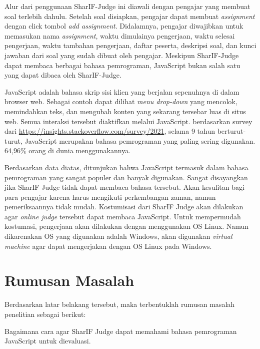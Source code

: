 \documentclass[a4paper,twoside]{article}
\begin{document}
Alur dari penggunaan SharIF-Judge ini diawali dengan pengajar yang membuat soal terlebih dahulu. Setelah soal disiapkan, pengajar dapat membuat \textit{assignment} dengan click tombol \textit{add assignment}. Didalamnya, pengajar diwajibkan untuk memasukan nama \textit{assignment}, waktu dimulainya pengerjaan, waktu selesai pengerjaan, waktu tambahan pengerjaan, daftar peserta, deskripsi soal, dan kunci jawaban dari soal yang sudah dibuat oleh pengajar. Meskipun SharIF-Judge dapat membaca berbagai bahasa pemrograman, JavaScript bukan salah satu yang dapat dibaca oleh SharIF-Judge.

JavaScript adalah bahasa skrip sisi klien yang berjalan sepenuhnya di dalam browser web. Sebagai contoh dapat dilihat \textit{menu drop-down} yang mencolok, memindahkan teks, dan mengubah konten yang sekarang tersebar luas di situs web. Semua interaksi tersebut diaktifkan melalui JavaScript. berdasarkan survey dari \url{https://insights.stackoverflow.com/survey/2021}, selama 9 tahun berturut-turut, JavaScript merupakan bahasa pemrograman yang paling sering digunakan. 64,96\% orang di dunia menggunakannya.

Berdasarkan data diatas, ditunjukan bahwa JavaScript termasuk dalam bahasa pemrograman yang sangat populer dan banyak digunakan. Sangat disayangkan jika SharIF Judge tidak dapat membaca bahasa tersebut. Akan kesulitan bagi para pengajar karena harus mengikuti perkembangan zaman, namun pemeriksaannya tidak mudah. Kostumisasi dari SharIF Judge akan dilakukan agar \textit{online judge} tersebut dapat membaca JavaScript. Untuk mempermudah kostumasi, pengerjaan akan dilakukan dengan menggunakan OS Linux. Namun dikarenakan OS yang digunakan adalah Windows, akan digunakan \textit{virtual machine} agar dapat mengerjakan dengan OS Linux pada Windows. 


\section{Rumusan Masalah}
\label{sec:rumusan}
Berdasarkan latar belakang tersebut, maka terbentuklah rumusan masalah penelitian sebagai berikut: 

     Bagaimana cara agar SharIF Judge dapat memahami bahasa pemrograman JavaScript untuk dievaluasi.
\end{document}
